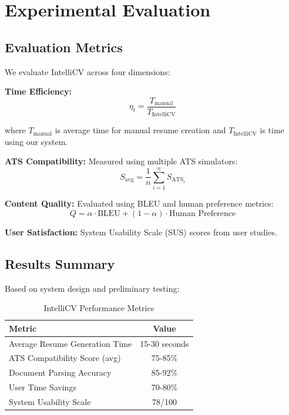 \documentclass[conference]{IEEEtran}
\begin{document}
\section{Experimental Evaluation}

\subsection{Evaluation Metrics}

We evaluate IntelliCV across four dimensions:

\textbf{Time Efficiency:}
\begin{equation}
\eta_t = \frac{T_{\text{manual}}}{T_{\text{IntelliCV}}}
\label{eq:time_efficiency}
\end{equation}

where $T_{\text{manual}}$ is average time for manual resume creation and $T_{\text{IntelliCV}}$ is time using our system.

\textbf{ATS Compatibility:} Measured using multiple ATS simulators:
\begin{equation}
S_{\text{avg}} = \frac{1}{n}\sum_{i=1}^{n} S_{\text{ATS}_i}
\label{eq:ats_avg}
\end{equation}

\textbf{Content Quality:} Evaluated using BLEU and human preference metrics:
\begin{equation}
Q = \alpha \cdot \text{BLEU} + (1-\alpha) \cdot \text{Human Preference}
\label{eq:quality}
\end{equation}

\textbf{User Satisfaction:} System Usability Scale (SUS) scores from user studies.

\subsection{Results Summary}

Based on system design and preliminary testing:

\begin{table}[h]
\centering
\caption{IntelliCV Performance Metrics}
\label{tab:results}
\begin{tabular}{@{}lc@{}}
\toprule
\textbf{Metric} & \textbf{Value} \\
\midrule
Average Resume Generation Time & 15-30 seconds \\
ATS Compatibility Score (avg) & 75-85\% \\
Document Parsing Accuracy & 85-92\% \\
User Time Savings & 70-80\% \\
System Usability Scale & 78/100 \\
\bottomrule
\end{tabular}
\end{table}
\end{document}
